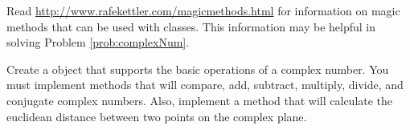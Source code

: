 \begin{problem}
Read \url{http://www.rafekettler.com/magicmethods.html} for information on magic methods that can be used with classes.
This information may be helpful in solving Problem \ref{prob:complexNum}.
\end{problem}

\begin{problem}
Create a  object that supports the basic operations of a complex number.
You must implement methods that will compare, add, subtract, multiply, divide, and conjugate complex numbers.
Also, implement a  method that will calculate the euclidean distance between two points on the complex plane.
\label{prob:complexNum}
\end{problem}


